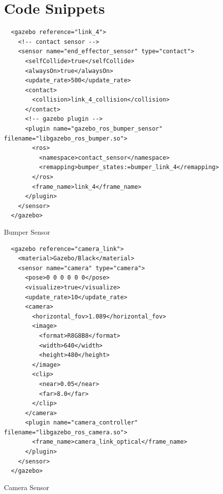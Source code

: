 \documentclass[12pt,oneside]{article}
\begin{document}

\clearpage



\appendix
\section{Code Snippets}
\begin{listing}[H]
\begin{tcolorbox}[]
\begin{verbatim} 
  <gazebo reference="link_4">
    <!-- contact sensor -->
    <sensor name="end_effector_sensor" type="contact">
      <selfCollide>true</selfCollide>
      <alwaysOn>true</alwaysOn>
      <update_rate>500</update_rate>
      <contact>
        <collision>link_4_collision</collision>
      </contact>
      <!-- gazebo plugin -->
      <plugin name="gazebo_ros_bumper_sensor" filename="libgazebo_ros_bumper.so">
        <ros>
          <namespace>contact_sensor</namespace>
          <remapping>bumper_states:=bumper_link_4</remapping>
        </ros>
        <frame_name>link_4</frame_name>
      </plugin>
    </sensor>
  </gazebo>
\end{verbatim}
\end{tcolorbox}
\caption{Bumper Sensor}
\label{bumperSensorXml}
\end{listing}

\begin{listing}[H]
\begin{tcolorbox}
\begin{verbatim} 
  <gazebo reference="camera_link">
    <material>Gazebo/Black</material>
    <sensor name="camera" type="camera">
      <pose>0 0 0 0 0 0</pose>
      <visualize>true</visualize>
      <update_rate>10</update_rate>
      <camera>
        <horizontal_fov>1.089</horizontal_fov>
        <image>
          <format>R8G8B8</format>
          <width>640</width>
          <height>480</height>
        </image>
        <clip>
          <near>0.05</near>
          <far>8.0</far>
        </clip>
      </camera>
      <plugin name="camera_controller" filename="libgazebo_ros_camera.so">
        <frame_name>camera_link_optical</frame_name>
      </plugin>
    </sensor>
  </gazebo>
\end{verbatim}
\end{tcolorbox}
\caption{Camera Sensor}
\label{cameraSensorXml}
\end{listing}
\end{document}

